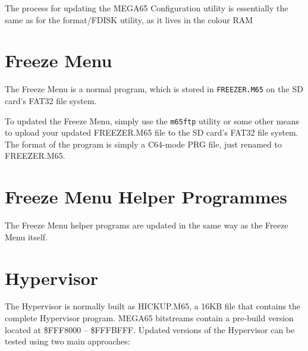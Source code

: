 The process for updating the MEGA65 Configuration utility is essentially the same as for the format/FDISK utility, as it lives in the colour RAM

\section{Freeze Menu}

The Freeze Menu is a normal program, which is stored in {\tt FREEZER.M65} on the SD card's FAT32 file system.

To updated the Freeze Menu, simply use the {\tt m65ftp} utility or some other means to upload your updated FREEZER.M65 file to the SD card's FAT32 file system.  The format of the program is simply a C64-mode PRG file, just renamed to FREEZER.M65.

\section{Freeze Menu Helper Programmes}

The Freeze Menu helper programs are updated in the same way as the Freeze Menu itself.

\section{Hypervisor}

The Hypervisor is normally built as HICKUP.M65, a 16KB file that contains the complete Hypervisor program.  MEGA65 bitstreams contain a pre-build version located at \$FFF8000 -- \$FFFBFFF.  Updated versions of the Hypervisor can be tested using two main approaches:

